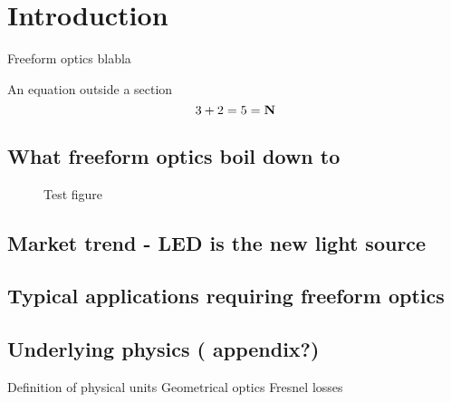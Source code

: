 \chapter{Introduction}
\label{ch:intro}

Freeform optics blabla

An equation outside a section
\begin{equation}
3+2=5 = \mathbf{N}
\label{eq1:tst_eq}
\end{equation}

\section{What freeform optics boil down to}
\begin{figure}
\centering
\caption{Test figure}
\end{figure}

\section{Market trend - LED is the new light source}

\section{Typical applications requiring freeform optics}

\section{Underlying physics ( appendix?)}

Definition of physical units
Geometrical optics
Fresnel losses
